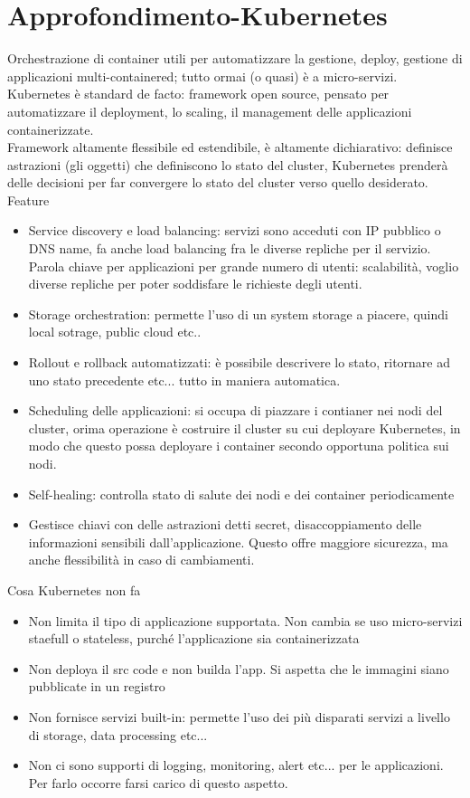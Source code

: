 \documentclass{article}
\begin{document}
\section{Approfondimento-Kubernetes}
Orchestrazione di container utili per automatizzare la gestione, deploy, gestione di applicazioni multi-containered; tutto ormai (o quasi) è a micro-servizi. Kubernetes è standard de facto: framework open source, pensato per automatizzare il deployment, lo scaling, il management delle applicazioni containerizzate.\\ Framework altamente flessibile ed estendibile, è altamente dichiarativo: definisce astrazioni (gli oggetti) che definiscono lo stato del cluster, Kubernetes prenderà delle decisioni per far convergere lo stato del cluster verso quello desiderato.\\ Feature
\begin{itemize}
\item Service discovery e load balancing: servizi sono acceduti con IP pubblico o DNS name, fa anche load balancing fra le diverse repliche per il servizio. Parola chiave per applicazioni per grande numero di utenti: scalabilità, voglio diverse repliche per poter soddisfare le richieste degli utenti.
\item Storage orchestration: permette l'uso di un system storage a piacere, quindi local sotrage, public cloud etc..
\item Rollout e rollback automatizzati: è possibile descrivere lo stato, ritornare ad uno stato precedente etc... tutto in maniera automatica.
\item Scheduling delle applicazioni: si occupa di piazzare i contianer nei nodi del cluster, orima operazione è costruire il cluster su cui deployare Kubernetes, in modo che questo possa deployare i container secondo opportuna politica sui nodi.
\item Self-healing: controlla stato di salute dei nodi e dei container periodicamente
\item Gestisce chiavi con delle astrazioni detti secret, disaccoppiamento delle informazioni sensibili dall'applicazione. Questo offre maggiore sicurezza, ma anche flessibilità in caso di cambiamenti.
\end{itemize}
Cosa Kubernetes non fa
\begin{itemize}
\item Non limita il tipo di applicazione supportata. Non cambia se uso micro-servizi staefull o stateless, purché l'applicazione sia containerizzata
\item Non deploya il src code e non builda l'app. Si aspetta che le immagini siano pubblicate in un registro
\item Non fornisce servizi built-in: permette l'uso dei più disparati servizi a livello di storage, data processing etc... 
\item Non ci sono supporti di logging, monitoring, alert etc... per le applicazioni. Per farlo occorre farsi carico di questo aspetto.
\end{itemize}
\end{document}
